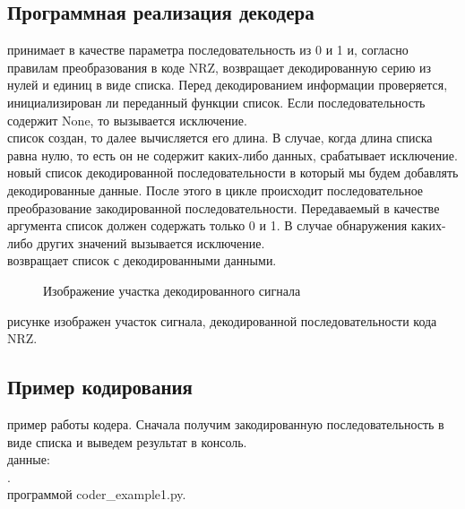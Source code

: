 \documentclass[a4paper14pt]{article}
\begin{document}
\newpage
\subsection{Программная реализация декодера}
 принимает в качестве параметра последовательность из 0 и 1 и, согласно правилам преобразования в коде NRZ, возвращает декодированную серию из нулей и единиц в виде списка. Перед декодированием информации проверяется, инициализирован ли переданный функции список. Если последовательность содержит None, то вызывается исключение.\\
 список создан, то далее вычисляется его длина. В случае, когда длина списка равна нулю, то есть он не содержит каких-либо данных, срабатывает исключение.\\
 новый список декодированной последовательности в который мы будем добавлять декодированные данные. После этого в цикле происходит последовательное преобразование закодированной последовательности. Передаваемый в качестве аргумента список должен содержать только 0 и 1. В случае обнаружения каких-либо других значений вызывается исключение.\\
 возвращает список с декодированными данными.\\
\begin{figure}[h!]
    \caption{Изображение участка декодированного сигнала}
\end{figure}

 рисунке изображен участок сигнала, декодированной последовательности кода NRZ.\\
\newpage
\subsection{Пример кодирования}
 пример работы кодера. Сначала получим закодированную последовательность в виде списка и выведем результат в консоль.\\
 данные:\\ 
\indent[1, 0, 1, 0, 1, 1, 0, 0].\\
\newpage
{} программой coder\_example1.py.\\
\end{document}
